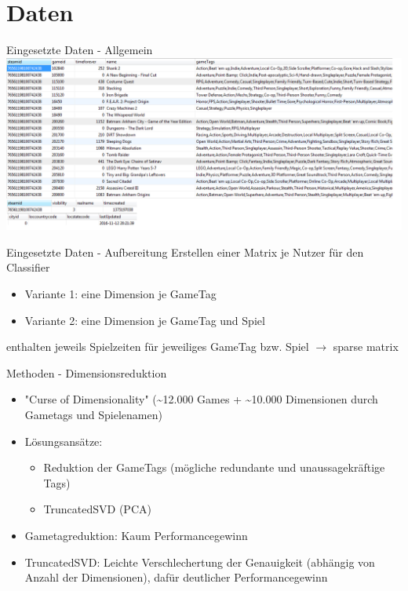 \documentclass[12pt]{beamer}
\begin{document}
\section{Daten}
\begin{frame}{Eingesetzte Daten - Allgemein}
	\includegraphics[scale=0.5]{steam_richard_info.png}
\end{frame}


\begin{frame}{Eingesetzte Daten - Aufbereitung}
	Erstellen einer Matrix je Nutzer für den Classifier
	\begin{itemize}
		\item Variante 1: eine Dimension je GameTag
		\item Variante 2: eine Dimension je GameTag und Spiel
	\end{itemize}
	enthalten jeweils Spielzeiten für jeweiliges GameTag bzw. Spiel
	$\rightarrow$ sparse matrix
	
\end{frame}


\begin{frame}{Methoden - Dimensionsreduktion}
	\begin{itemize}
	\item "Curse of Dimensionality" (\textasciitilde 12.000 Games + \textasciitilde 10.000 Dimensionen durch Gametags und Spielenamen)
	\item Lösungsansätze:
		\begin{itemize}
		\item Reduktion der GameTags (mögliche redundante und unaussagekräftige Tags)
		\item TruncatedSVD (PCA)
		\end{itemize}
	\item Gametagreduktion: Kaum Performancegewinn
	\item TruncatedSVD: Leichte Verschlechertung der Genauigkeit (abhängig von Anzahl der Dimensionen), dafür deutlicher Performancegewinn
	\end{itemize}
\end{frame}
\end{document}
